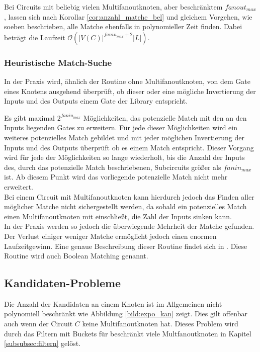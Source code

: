 \documentclass[11pt, a4paper, german]{article}
\begin{document}
Bei Circuits mit beliebig vielen Multifanoutknoten, aber beschränktem $fanout_{max}$, lassen sich nach Korollar \ref{cor:anzahl_matche_bel} und gleichem Vorgehen, wie soeben beschrieben, alle Matche ebenfalls in polynomieller Zeit finden. Dabei beträgt die Laufzeit $\mathcal{O}(|V(C)|^{fanin_{max}+2}|L|)$.

\subsubsection{Heuristische Match-Suche}
In der Praxis wird, ähnlich der Routine ohne Multifanoutknoten, von dem Gate eines Knotens ausgehend überprüft, ob dieser oder eine mögliche Invertierung der Inputs und des Outputs einem Gate der Library entspricht. 

Es gibt maximal $2^{fanin_{max}}$ Möglichkeiten, das potenzielle Match mit den an den Inputs liegenden Gates zu erweitern. Für jede dieser Möglichkeiten wird ein weiteres potenzielles Match gebildet und mit jeder möglichen Invertierung der Inputs und des Outputs überprüft ob es einem Match entspricht.
Dieser Vorgang wird für jede der Möglichkeiten so lange wiederholt, bis die Anzahl der Inputs des, durch das potenzielle Match beschriebenen, Subcircuits größer als $fanin_{max}$ ist. Ab diesem Punkt wird das vorliegende potenzielle Match nicht mehr erweitert. \\
Bei einem Circuit mit Multifanoutknoten kann hierdurch jedoch das Finden aller möglicher Matche nicht sichergestellt werden, da sobald ein potenzielles Match einen Multifanoutknoten mit einschließt, die Zahl der Inputs sinken kann. \\
In der Praxis werden so jedoch die überwiegende Mehrheit der Matche gefunden. Der Verlust einiger weniger Matche ermöglicht jedoch einen enormen Laufzeitgewinn.
Eine genaue Beschreibung dieser Routine findet sich in \cite{BooleanMatching}. Diese Routine wird auch Boolean Matching genannt.

\subsection{Kandidaten-Probleme}
\label{subsec:kand_prob}
Die Anzahl der Kandidaten an einem Knoten ist im Allgemeinen nicht polynomiell beschränkt wie Abbildung \ref{bild:expo_kan} zeigt. Dies gilt offenbar auch wenn der Circuit $C$ keine Multifanoutknoten hat. Dieses Problem wird durch das Filtern mit Buckets für beschränkt viele Multfanoutknoten in Kapitel \ref{subsubsec:filtern} gelöst.
\end{document}

